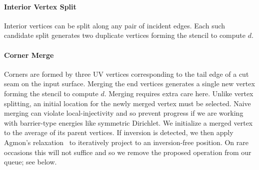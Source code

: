 \paragraph{Interior Vertex Split}
Interior vertices can be split along any pair of incident edges. Each such candidate split generates two duplicate vertices forming the stencil to compute $d$. 

\paragraph{Corner Merge}
Corners are formed by three UV vertices corresponding to the tail edge of a cut seam on the input surface. Merging the end vertices generates a single new vertex forming the stencil to compute $d$. Merging requires extra care here. Unlike vertex splitting, an initial location for the newly merged vertex must be selected. Naive merging can violate local-injectivity and so prevent progress if we are working with barrier-type energies like symmetric Dirichlet. We initialize a merged vertex to the average of its parent vertices. If inversion is detected, we then apply Agmon's relaxation~ to iteratively project to an inversion-free position. On rare occasions this will not suffice and so we remove the proposed operation from our queue; see below.

